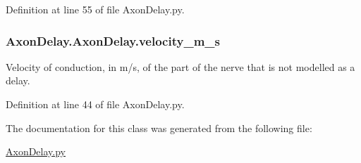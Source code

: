 Definition at line 55 of file Axon\+Delay.\+py.

\subsubsection[{\texorpdfstring{velocity\+\_\+m\+\_\+s}{velocity_m_s}}]{\setlength{\rightskip}{0pt plus 5cm}Axon\+Delay.\+Axon\+Delay.\+velocity\+\_\+m\+\_\+s}\hypertarget{class_axon_delay_1_1_axon_delay_a59cc448f95b38b88b7103c3058e8c397}{}\label{class_axon_delay_1_1_axon_delay_a59cc448f95b38b88b7103c3058e8c397}


Velocity of conduction, in m/s, of the part of the nerve that is not modelled as a delay. 



Definition at line 44 of file Axon\+Delay.\+py.



The documentation for this class was generated from the following file\+:\begin{DoxyCompactItemize}
\item 
\hyperlink{_axon_delay_8py}{Axon\+Delay.\+py}\end{DoxyCompactItemize}
